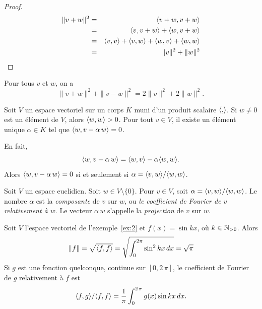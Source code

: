 \begin{proof}
  \begin{eqnarray*}
     \|v+w\|^2 &= & \langle {v+w,v+w} \rangle \\
               & = & \langle {v,v+w} \rangle + \langle {w,v+w} \rangle \\
               & = & \langle {v,v} \rangle + \langle {v,w} \rangle + \langle {w,v} \rangle + \langle {w,w} \rangle \\
               & = & \|v\|^2 + \|w\|^2
  \end{eqnarray*}
\end{proof}

\begin{proposition} Pour tous $v$ et $w$, on a 
  \begin{displaymath}
    \|v+w\|^2 + \|v-w\|^2 = 2 \|v\|^2 + 2 \|w\|^2.  
  \end{displaymath}  
\end{proposition}



Soit $V$ un espace vectoriel sur un corps $K$ muni d'un produit scalaire  $\langle {,} \rangle$. 
Si $w ≠ 0$ est un élément de $V$, alors  $\langle {w,w} \rangle >0$. Pour  tout $v \in V$, il existe un élément unique $\alpha \in K$ tel que $\langle {w,v -\alpha\, w} \rangle = 0$. 

En fait,
\begin{displaymath}
  \langle {w,v -\alpha\, w} \rangle = \langle {w,v} \rangle - \alpha \langle {w,w} \rangle. 
\end{displaymath}
Alors $\langle {w,v -\alpha\, w} \rangle = 0$ si et seulement si $\alpha = \langle {v,w} \rangle / \langle {w,w} \rangle$. 


\begin{definition}
  \label{def:6}
  Soit $V$ un espace euclidien. 
  Soit $w \in V \setminus \{0\}$. Pour $v \in V$, soit $\alpha = \langle {v,w} \rangle / \langle {w,w} \rangle$.  Le nombre $\alpha$ est la \emph{composante} de $v$ sur $w$, ou \emph{le coefficient de Fourier de $v$ relativement à $w$}. Le vecteur $\alpha \, w$ s'appelle la \emph{projection} de $v$ sur $w$. 
\end{definition}


\begin{example}
  \label{exe:5}
  Soit $V$ l'espace vectoriel de l'exemple~\ref{ex:2} et $f(x) = \sin kx$, où $k \in \mathbb{N}_{>0}$. Alors
  \begin{displaymath}
   \|f\| = \sqrt{\langle {f,f} \rangle} =  \sqrt{\int_0^{2\pi} \sin^2 kx \, dx} = \sqrt{\pi}
  \end{displaymath}
Si $g$ est une fonction quelconque, continue sur $[0,2\,\pi]$, le coefficient de Fourier de $g$ relativement à $f$ est 
\begin{displaymath}
  \langle {f,g} \rangle /   \langle {f,f} \rangle  = \frac{1}{\pi} \int_0^{2\, \pi} g(x) \sin kx \,dx. 
\end{displaymath}
\end{example}



